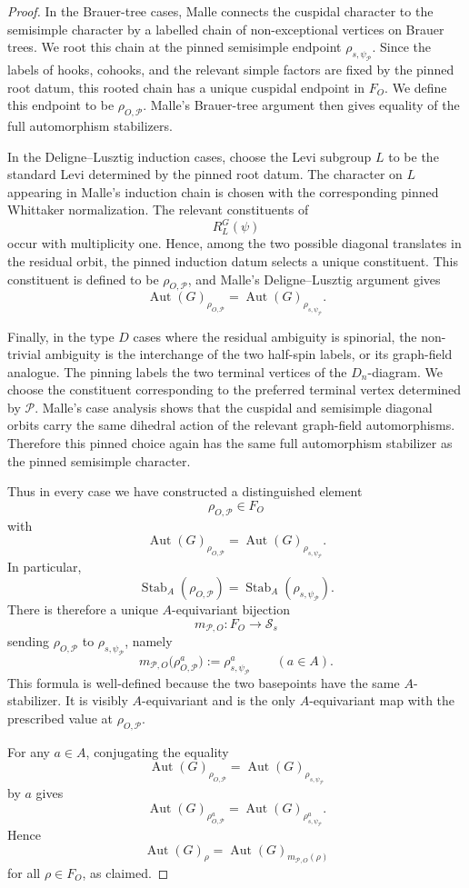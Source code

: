 \documentclass[10pt,a4paper]{amsart}
\newcommand{\Aut}{\operatorname{Aut}}
\newcommand{\Stab}{\operatorname{Stab}}
\newcommand{\cP}{\mathcal{P}}
\begin{document}
\begin{proof}
In the Brauer-tree cases, Malle connects the cuspidal character to the
semisimple character by a labelled chain of non-exceptional vertices on
Brauer trees.  We root this chain at the pinned semisimple endpoint
\(\rho_{s,\psi_{\cP}}\).  Since the labels of hooks, cohooks, and the relevant
simple factors are fixed by the pinned root datum, this rooted chain has a
unique cuspidal endpoint in \(F_O\).  We define this endpoint to be
\(\rho_{O,\cP}\).  Malle's Brauer-tree argument then gives equality of the
full automorphism stabilizers.

In the Deligne--Lusztig induction cases, choose the Levi subgroup \(L\) to be
the standard Levi determined by the pinned root datum.  The character on \(L\)
appearing in Malle's induction chain is chosen with the corresponding pinned
Whittaker normalization.  The relevant constituents of
\[
        R_L^G(\psi)
\]
occur with multiplicity one.  Hence, among the two possible diagonal translates
in the residual orbit, the pinned induction datum selects a unique constituent.
This constituent is defined to be \(\rho_{O,\cP}\), and Malle's
Deligne--Lusztig argument gives
\[
        \Aut(G)_{\rho_{O,\cP}}
        =
        \Aut(G)_{\rho_{s,\psi_{\cP}}}.
\]

Finally, in the type \(D\) cases where the residual ambiguity is spinorial, the
non-trivial ambiguity is the interchange of the two half-spin labels, or its
graph-field analogue.  The pinning labels the two terminal vertices of the
\(D_n\)-diagram.  We choose the constituent corresponding to the preferred
terminal vertex determined by \(\cP\).  Malle's case analysis shows that the
cuspidal and semisimple diagonal orbits carry the same dihedral action of the
relevant graph-field automorphisms.  Therefore this pinned choice again has
the same full automorphism stabilizer as the pinned semisimple character.

Thus in every case we have constructed a distinguished element
\[
        \rho_{O,\cP}\in F_O
\]
with
\[
        \Aut(G)_{\rho_{O,\cP}}
        =
        \Aut(G)_{\rho_{s,\psi_{\cP}}}.
\]
In particular,
\[
        \Stab_A(\rho_{O,\cP})
        =
        \Stab_A(\rho_{s,\psi_{\cP}}).
\]
There is therefore a unique \(A\)-equivariant bijection
\[
        m_{\cP,O}:F_O\longrightarrow \mathcal S_s
\]
sending \(\rho_{O,\cP}\) to \(\rho_{s,\psi_{\cP}}\), namely
\[
        m_{\cP,O}\bigl(\rho_{O,\cP}^a\bigr)
        :=
        \rho_{s,\psi_{\cP}}^a
        \qquad(a\in A).
\]
This formula is well-defined because the two basepoints have the same
\(A\)-stabilizer.  It is visibly \(A\)-equivariant and is the only
\(A\)-equivariant map with the prescribed value at \(\rho_{O,\cP}\).

For any \(a\in A\), conjugating the equality
\[
        \Aut(G)_{\rho_{O,\cP}}
        =
        \Aut(G)_{\rho_{s,\psi_{\cP}}}
\]
by \(a\) gives
\[
        \Aut(G)_{\rho_{O,\cP}^a}
        =
        \Aut(G)_{\rho_{s,\psi_{\cP}}^a}.
\]
Hence
\[
        \Aut(G)_\rho
        =
        \Aut(G)_{m_{\cP,O}(\rho)}
\]
for all \(\rho\in F_O\), as claimed.
\end{proof}
\end{document}
